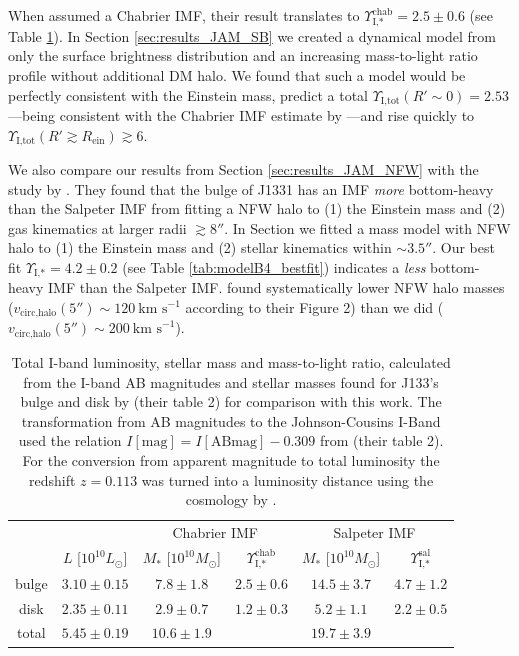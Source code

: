 When \citet{SWELLSI} assumed a Chabrier IMF, their result translates to $\Upsilon_\text{I,*}^\text{chab} = 2.5 \pm 0.6$ (see Table \ref{tab:previousresults}). In Section \ref{sec:results_JAM_SB} we created a dynamical model from only the surface brightness distribution and an increasing mass-to-light ratio profile without additional DM halo. We found that such a model would be perfectly consistent with the Einstein mass, predict a total $\Upsilon_\text{I,tot}(R'\sim0) = 2.53$---being consistent with the Chabrier IMF estimate by \citet{SWELLSI}---and rise quickly to $\Upsilon_\text{I,tot}(R'\gtrsim R_\text{ein}) \gtrsim 6$.

We also compare our results from Section \ref{sec:results_JAM_NFW} with the study by \citet{SWELLSV}. They found that the bulge of J1331 has an IMF \emph{more} bottom-heavy than the Salpeter IMF from fitting a NFW halo to (1) the Einstein mass and (2) gas kinematics at larger radii $\gtrsim 8''$. In Section we fitted a mass model with NFW halo to (1) the Einstein mass and (2) stellar kinematics within $\sim 3.5''$. Our best fit $\Upsilon_\text{I,*} = 4.2 \pm 0.2$ (see Table \ref{tab:modelB4_bestfit}) indicates a \emph{less} bottom-heavy IMF than the Salpeter IMF. \cite{SWELLSV} found systematically lower NFW halo masses ($v_\text{circ,halo}(5'') \sim 120~\text{km s}^{-1}$ according to their Figure 2) than we did ($v_\text{circ,halo}(5'') \sim 200~\text{km s}^{-1}$).


\begin{table}
\centering
\begin{tabular}{cccccc}
\hline\hline
& & \multicolumn{2}{c}{Chabrier IMF} & \multicolumn{2}{c}{Salpeter IMF}\\
      &  $L$ [$10^{10}L_{\odot}$]                & $M_*$ [$10^{10}M_\odot$]               & $\Upsilon_\text{I,*}^\text{chab}$ & $M_*$ [$10^{10}M_\odot$] & $\Upsilon_\text{I,*}^\text{sal}$ \\\hline
bulge &   $3.10 \pm 0.15 $  & $7.8 \pm 1.8$ & $2.5 \pm 0.6$ & $14.5 \pm 3.7 $ & $4.7 \pm 1.2$ \\
disk  &   $2.35 \pm 0.11 $  & $2.9 \pm 0.7$ & $1.2 \pm 0.3$ & $5.2 \pm 1.1$ & $2.2 \pm 0.5$ \\
total &   $5.45 \pm 0.19$ & $10.6 \pm 1.9$& & $19.7 \pm 3.9$&\\\hline
\end{tabular}
\caption{Total I-band luminosity, stellar mass and mass-to-light ratio, calculated from the I-band AB magnitudes and stellar masses found for J133's bulge and disk by \citet{SWELLSI} (their table 2) for comparison with this work. The transformation from AB magnitudes to the Johnson-Cousins I-Band used the relation $I[\text{mag}] = I[\text{ABmag}] - 0.309$ from \citet{FG1994} (their table 2). For the conversion from apparent magnitude to total luminosity the redshift $z=0.113$ \citet{SWELLSIII} was turned into a luminosity distance using the cosmology by \citet{WMAP5cosm}. }
\label{tab:previousresults}
\end{table}

